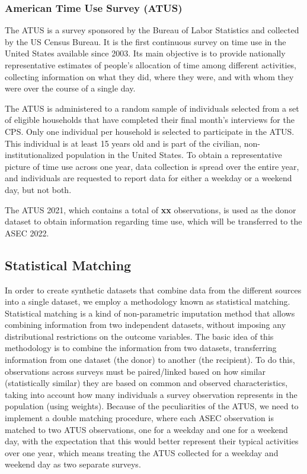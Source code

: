 \documentclass[
  11pt,
]{article}
\begin{document}
\subsubsection{American Time Use Survey
(ATUS)}\label{american-time-use-survey-atus}

The ATUS is a survey sponsored by the Bureau of Labor Statistics and
collected by the US Census Bureau. It is the first continuous survey on
time use in the United States available since 2003. Its main objective
is to provide nationally representative estimates of people's allocation
of time among different activities, collecting information on what they
did, where they were, and with whom they were over the course of a
single day.

The ATUS is administered to a random sample of individuals selected from
a set of eligible households that have completed their final month's
interviews for the CPS. Only one individual per household is selected to
participate in the ATUS. This individual is at least 15 years old and is
part of the civilian, non-institutionalized population in the United
States. To obtain a representative picture of time use across one year,
data collection is spread over the entire year, and individuals are
requested to report data for either a weekday or a weekend day, but not
both.

The ATUS 2021, which contains a total of \textbf{xx} observations, is
used as the donor dataset to obtain information regarding time use,
which will be transferred to the ASEC 2022.

\subsection{Statistical Matching}\label{statistical-matching}

In order to create synthetic datasets that combine data from the
different sources into a single dataset, we employ a methodology known
as statistical matching. Statistical matching is a kind of
non-parametric imputation method that allows combining information from
two independent datasets, without imposing any distributional
restrictions on the outcome variables. The basic idea of this
methodology is to combine the information from two datasets,
transferring information from one dataset (the donor) to another (the
recipient). To do this, observations across surveys must be
paired/linked based on how similar (statistically similar) they are
based on common and observed characteristics, taking into account how
many individuals a survey observation represents in the population
(using weights). Because of the peculiarities of the ATUS, we need to
implement a double matching procedure, where each ASEC observation is
matched to two ATUS observations, one for a weekday and one for a
weekend day, with the expectation that this would better represent their
typical activities over one year, which means treating the ATUS
collected for a weekday and weekend day as two separate surveys.
\end{document}
